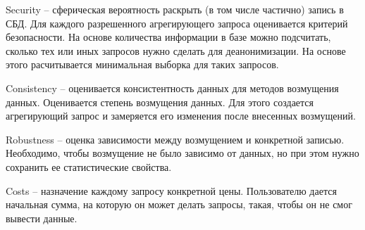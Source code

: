 Security -- сферическая вероятность раскрыть (в том числе частично) запись в СБД. Для каждого разрешенного агрегирующего запроса оценивается критерий безопасности. На основе количества информации в базе можно подсчитать, сколько тех или иных запросов нужно сделать для деанонимизации. На основе этого расчитывается минимальная выборка для таких запросов.

Consistency -- оценивается консистентность данных для методов возмущения данных. Оценивается степень возмущения данных. Для этого создается агрегирующий запрос и замеряется его изменения после внесенных возмущений.

Robustness -- оценка зависимости между возмущением и конкретной записью. Необходимо, чтобы возмущение не было зависимо от данных, но при этом нужно сохранить ее статистические свойства.

Costs -- назначение каждому запросу конкретной цены. Пользователю дается начальная сумма, на которую он может делать запросы, такая, чтобы он не смог вывести данные.
